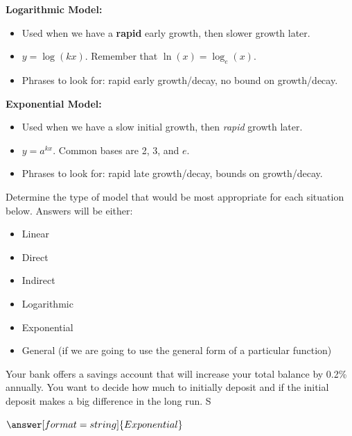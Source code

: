 \documentclass{ximera}
\begin{document}
\textbf{Logarithmic Model:}
\begin{itemize}
    \item Used when we have a \textbf{rapid} early growth, then slower growth later. 
    \item $y = \log(kx)$. Remember that $\ln(x) = \log_e(x)$. 
    \item Phrases to look for: rapid early growth/decay, no bound on growth/decay.
\end{itemize}

\textbf{Exponential Model:}
\begin{itemize}
    \item Used when we have a slow initial growth, then \textit{rapid} growth later.
    \item $y = a^{kx}$. Common bases are 2, 3, and $e$.
    \item Phrases to look for: rapid late growth/decay, bounds on growth/decay.
\end{itemize}


Determine the type of model that would be most appropriate for each situation below. Answers will be either:
\begin{itemize}
    \item Linear 
    \item Direct
    \item Indirect
    \item Logarithmic
    \item Exponential
    \item General (if we are going to use the general form of a particular function)
\end{itemize}

\begin{question}
Your bank offers a savings account that will increase your total balance by 0.2\% annually. You want to decide how much to initially deposit and if the initial deposit makes a big difference in the long run. S

$\answer[format=string]{Exponential}$

\end{question}
\end{document}
